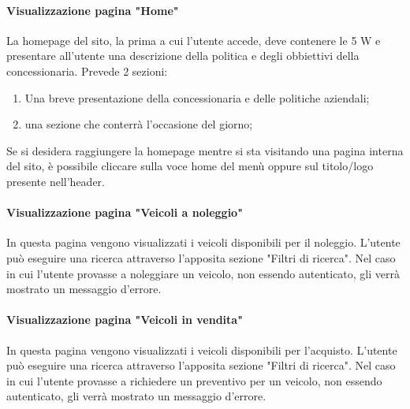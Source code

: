         \paragraph{Visualizzazione pagina "Home"}
        La homepage del sito, la prima a cui l'utente accede, deve contenere le 5 W e presentare all'utente una descrizione della politica e degli obbiettivi della concessionaria.
        Prevede 2 sezioni:
        \begin{enumerate}
            \item Una breve presentazione della concessionaria e delle politiche aziendali; 
            \item una sezione che conterrà l'occasione del giorno;
            \end{enumerate}
        Se si desidera raggiungere la homepage mentre si sta visitando una pagina interna del sito, è possibile cliccare sulla voce home del menù oppure sul titolo/logo presente nell'header.

        \paragraph{Visualizzazione pagina "Veicoli a noleggio"}
        In questa pagina vengono visualizzati i veicoli disponibili per il noleggio. L'utente può eseguire una ricerca attraverso l'apposita sezione "Filtri di ricerca". Nel caso in cui l'utente provasse a noleggiare un veicolo, non essendo autenticato, gli verrà mostrato un messaggio d'errore.

        \paragraph{Visualizzazione pagina "Veicoli in vendita"}
        In questa pagina vengono visualizzati i veicoli disponibili per l'acquisto. L'utente può eseguire una ricerca attraverso l'apposita sezione "Filtri di ricerca". Nel caso in cui l'utente provasse a richiedere un preventivo per un veicolo, non essendo autenticato, gli verrà mostrato un messaggio d'errore.

